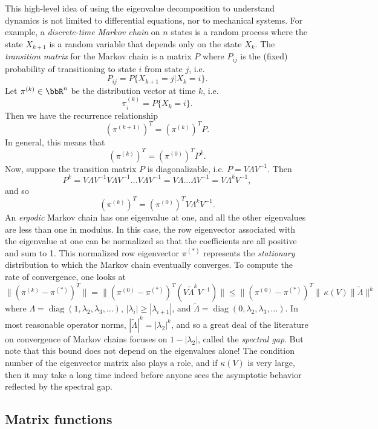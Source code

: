 \documentclass[12pt, leqno]{article} %
\begin{document}
This high-level idea of using the eigenvalue decomposition to
understand dynamics is not limited to differential equations, nor to
mechanical systems.  For example, a {\em discrete-time Markov chain}
on $n$ states is a random process where the state $X_{k+1}$ is a
random variable that depends only on the state $X_k$.  The {\em
  transition matrix} for the Markov chain is a matrix $P$ where
$P_{ij}$ is the (fixed) probability of transitioning to state $i$ from
state $j$, i.e.
\[
  P_{ij} = P\{X_{k+1} = j | X_{k} = i\}.
\]
Let $\pi^{(k)} \in \bbR^n$ be the distribution vector at time $k$,
i.e.
\[
  \pi^{(k)}_i = P\{X_k = i\}.
\]
Then we have the recurrence relationship
\[
  (\pi^{(k+1)})^T = (\pi^{(k)})^T P.
\]
In general, this means that
\[
  (\pi^{(k)})^T = (\pi^{(0)})^T P^k.
\]
Now, suppose the transition matrix $P$ is diagonalizable, i.e. $P = V
\Lambda V^{-1}$.  Then
\[
  P^k = V \Lambda V^{-1} V \Lambda V^{-1} \ldots V \Lambda V^{-1}
      = V \Lambda \ldots \Lambda V^{-1} = V \Lambda^k V^{-1},
\]
and so
\[
  (\pi^{(k)})^T = (\pi^{(0)})^T V \Lambda^k V^{-1}.
\]
An {\em ergodic} Markov chain has one eigenvalue at one, and all the
other eigenvalues are less than one in modulus.  In this case, the row
eigenvector associated with the eigenvalue at one can be normalized so
that the coefficients are all positive and sum to 1.  This normalized
row eigenvector $\pi^{(*)}$ represents the {\em stationary}
distribution to which the Markov chain eventually converges.  To
compute the rate of convergence, one looks at
\[
  \|(\pi^{(k)}-\pi^{(*)})^T\| =
  \|(\pi^{(0)}-\pi^{(*)})^T (V \tilde{\Lambda}^k V^{-1})\| \leq
  \|(\pi^{(0)}-\pi^{(*)})^T \| \, \kappa(V) \|\tilde{\Lambda}\|^k
\]
where $\Lambda = \operatorname{diag}(1, \lambda_2, \lambda_3,
\ldots)$, $|\lambda_i| \geq |\lambda_{i+1}|$, and $\tilde{\Lambda} =
\operatorname{diag}(0, \lambda_2, \lambda_3, \ldots)$.  In most
reasonable operator norms, $|\tilde{\Lambda}|^k = |\lambda_2|^k$,
and so a great deal of the literature on convergence of Markov chains
focuses on $1-|\lambda_2|$, called the {\em spectral gap}.
But note that this bound does not depend on the eigenvalues alone!
The condition number of the eigenvector matrix also plays a role, and
if $\kappa(V)$ is very large, then it may take a long time indeed
before anyone sees the asymptotic behavior reflected by the spectral gap.

\subsection{Matrix functions}
\end{document}
